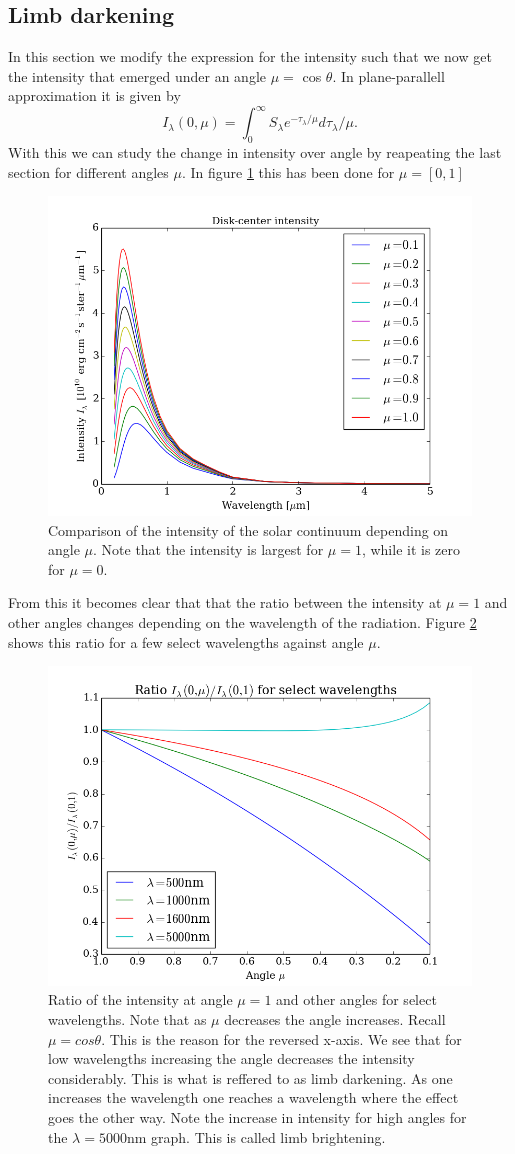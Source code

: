 \documentclass{aa}   %
\begin{document}
\subsection{Limb darkening}
In this section we modify the expression for the intensity such that we now get the intensity that emerged under an angle $\mu =$ cos $\theta$. In plane-parallell approximation it is given by
\begin{equation}
 I_\lambda(0,\mu) = \int_0^\infty S_\lambda e^{-\tau_\lambda/\mu}d\tau_\lambda/\mu.
\end{equation}
With this we can study the change in intensity over angle by reapeating the last section for different angles $\mu$.
In figure \ref{intensitycompared_angle} this has been done for $\mu = [0,1]$

\begin{figure}
 \includegraphics[width=.49\textwidth]{intensitycompared_angle.png}
 \caption{Comparison of the intensity of the solar continuum depending on angle $\mu$. Note that the intensity is largest for $\mu = 1$, while it is zero for $\mu = 0$.}
\label{intensitycompared_angle}
\end{figure}
From this it becomes clear that that the ratio between the intensity at $\mu = 1$ and other angles changes depending on the wavelength of the radiation. Figure \ref{ratiointensityangle} shows this ratio for a few select wavelengths against angle $\mu$. 

\begin{figure}
 \includegraphics[width=.49\textwidth]{ratiointensityangle.png}
 \caption{Ratio of the intensity at angle $\mu=1$ and other angles for select wavelengths. Note that as $\mu$ decreases the angle increases. Recall $\mu = cos\theta$. This is the reason for the reversed x-axis. We see that for low wavelengths increasing the angle decreases the intensity considerably. This is what is reffered to as limb darkening. As one increases the wavelength one reaches a wavelength where the effect goes the other way. Note the increase in intensity for high angles for the $\lambda = 5000$nm graph. This is called limb brightening.}
\label{ratiointensityangle}
\end{figure}
\end{document}
